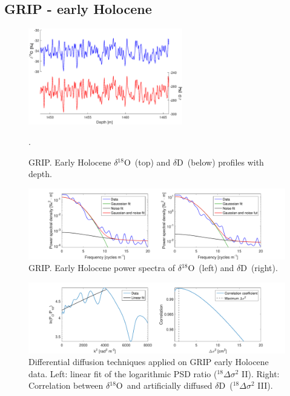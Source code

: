 \documentclass[11pt, draftcls, onecolumn]{IEEEtran} %
\numberwithin{equation}{section}
\numberwithin{table}{section}
\numberwithin{figure}{section}
\newcommand{\delOx}{$\delta{}^{18}\mathrm{O}$}
\newcommand{\delD}{$\delta\mathrm{D}$}
\begin{document}
\begin{appendices}
\clearpage
\subsection{GRIP - early Holocene}

\begin{figure}[H]
	\vspace*{2mm}
	\begin{center}
		\includegraphics[width=0.6\textwidth]{GRIP_early_holo}
		\caption{GRIP. Early Holocene \delOx~(top) and \delD~(below) profiles with depth.}  \label{fig:GRIP_early_holo}.
	\end{center}
\end{figure}

\begin{figure}[H]
	\vspace*{2mm}
	\centering
		\includegraphics[width=1\textwidth]{Figure_23}
		\caption{GRIP. Early Holocene power spectra of \delOx~(left) and \delD~(right).}  \label{fig:GRIP_early_fig_1}
\end{figure}

\begin{figure}[H]
	\vspace*{2mm}
	\begin{center}
		\includegraphics[width=1\textwidth]{Figure_24}
		\caption{Differential diffusion techniques applied on GRIP early Holocene data. 
			Left: linear fit of the logarithmic PSD ratio ($^{18}\Delta\sigma^2$ II). Right: 
			Correlation between \delOx~and artificially diffused \delD~($^{18}\Delta\sigma^2$ III).}  \label{fig:GRIP_early_fig_2}
	\end{center}
\end{figure}


\end{appendices}
\end{document}
